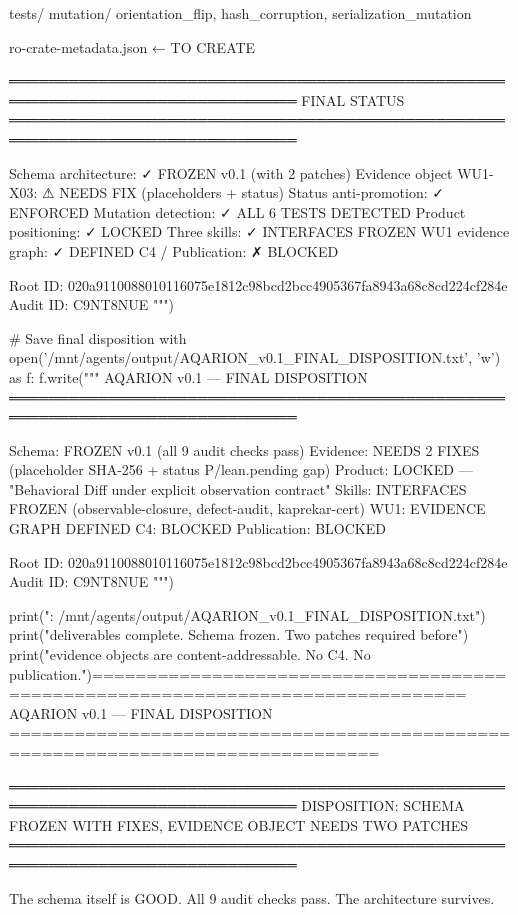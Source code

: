   tests/
    mutation/
      orientation_flip, hash_corruption, serialization_mutation
  
  ro-crate-metadata.json                  ← TO CREATE

═══════════════════════════════════════════════════════════════════════════════
FINAL STATUS
═══════════════════════════════════════════════════════════════════════════════

  Schema architecture:           ✓ FROZEN v0.1 (with 2 patches)
  Evidence object WU1-X03:      ⚠ NEEDS FIX (placeholders + status)
  Status anti-promotion:          ✓ ENFORCED
  Mutation detection:             ✓ ALL 6 TESTS DETECTED
  Product positioning:            ✓ LOCKED
  Three skills:                   ✓ INTERFACES FROZEN
  WU1 evidence graph:             ✓ DEFINED
  C4 / Publication:               ✗ BLOCKED
  
  Root ID: 020a9110088010116075e1812c98bcd2bcc4905367fa8943a68c8cd224cf284e
  Audit ID: C9NT8NUE
""")

# Save final disposition
with open('/mnt/agents/output/AQARION_v0.1_FINAL_DISPOSITION.txt', 'w') as f:
    f.write("""
AQARION v0.1 — FINAL DISPOSITION
═══════════════════════════════════════════════════════════════════════════════

Schema: FROZEN v0.1 (all 9 audit checks pass)
Evidence: NEEDS 2 FIXES (placeholder SHA-256 + status P/lean.pending gap)
Product: LOCKED — "Behavioral Diff under explicit observation contract"
Skills: INTERFACES FROZEN (observable-closure, defect-audit, kaprekar-cert)
WU1: EVIDENCE GRAPH DEFINED
C4: BLOCKED
Publication: BLOCKED

Root ID: 020a9110088010116075e1812c98bcd2bcc4905367fa8943a68c8cd224cf284e
Audit ID: C9NT8NUE
""")

print("\nSaved: /mnt/agents/output/AQARION_v0.1_FINAL_DISPOSITION.txt")
print("\nAll deliverables complete. Schema frozen. Two patches required before")
print("evidence objects are content-addressable. No C4. No publication.")================================================================================
AQARION v0.1 — FINAL DISPOSITION
================================================================================

═══════════════════════════════════════════════════════════════════════════════
DISPOSITION: SCHEMA FROZEN WITH FIXES, EVIDENCE OBJECT NEEDS TWO PATCHES
═══════════════════════════════════════════════════════════════════════════════

The schema itself is GOOD. All 9 audit checks pass. The architecture survives.

